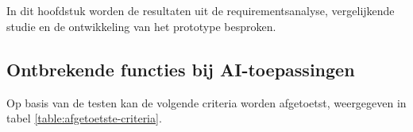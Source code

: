 \chapter{}%
\label{ch:resultaten}

In dit hoofdstuk worden de resultaten uit de requirementsanalyse, vergelijkende studie en de ontwikkeling van het prototype besproken. 

\section{Ontbrekende functies bij AI-toepassingen}


Op basis van de testen kan de volgende criteria worden afgetoetst, weergegeven in tabel \ref{table:afgetoetste-criteria}.

